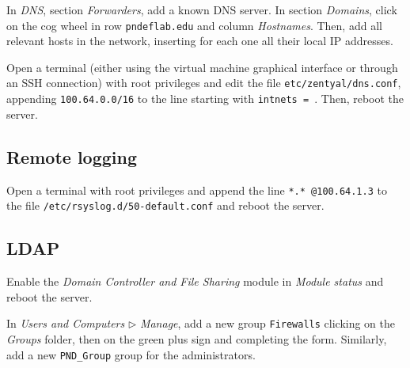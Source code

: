 \documentclass[draft]{homework}
\begin{document}
    In \textit{DNS}, section \textit{Forwarders}, add a known DNS server.
    In section \textit{Domains}, click on the cog wheel in row \texttt{pndeflab.edu} and column \textit{Hostnames}.
    Then, add all relevant hosts in the network, inserting for each one all their local IP addresses.
    
    Open a terminal (either using the virtual machine graphical interface or through an SSH connection) with root privileges and edit the file \texttt{etc/zentyal/dns.conf}, appending \texttt{100.64.0.0/16} to the line starting with \texttt{intnets = }. Then, reboot the server.
    
    \subsection{Remote logging}
    Open a terminal with root privileges and append the line \texttt{*.* @100.64.1.3} to the file \texttt{/etc/rsyslog.d/50-default.conf} and reboot the server.

    \subsection{LDAP}
    Enable the \textit{Domain Controller and File Sharing } module in \textit{Module status} and reboot the server.
    
    In \textit{Users and Computers} $\triangleright$ \textit{Manage}, add a new group \texttt{Firewalls} clicking on the \textit{Groups} folder, then on the green plus sign and completing the form.
    Similarly, add a new \texttt{PND\_Group} group for the administrators.
    
\end{document}
